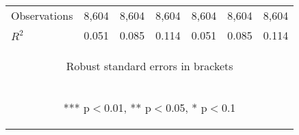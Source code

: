 \begin{center}
\begin{tabular}{lcccccc}
Observations & 8,604 & 8,604 & 8,604 & 8,604 & 8,604 & 8,604 \\
 $R^2$ & 0.051 & 0.085 & 0.114 & 0.051 & 0.085 & 0.114 \\ \hline
\multicolumn{7}{c}{\begin{footnotesize} Robust standard errors in brackets\end{footnotesize}} \\
\multicolumn{7}{c}{\begin{footnotesize} *** p$<$0.01, ** p$<$0.05, * p$<$0.1\end{footnotesize}} \\
\end{tabular}
\end{center}
